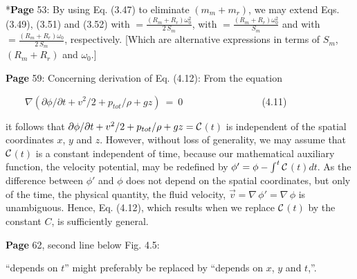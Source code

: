 \documentclass[a4paper,12pt]{article}
\begin{document}
\noindent %
*{\bf Page} 53: By using Eq. (3.47) to eliminate $(m_m + m_r)$, we may extend Eqs. (3.49), (3.51) and (3.52) with \quad  $= \frac{(R_m + R_r)\omega_0^2}{2 \, S_m}$, \quad with \quad $= \frac{(R_m + R_r)\omega_0^2}{S_m}$ \quad and with $= \frac{(R_m + R_r)\omega_0}{2 \, S_m}$, respectively. [Which are alternative expressions in terms of $S_m$, $(R_m + R_r)$ and $\omega_0$.] 
\newline {$\diamondsuit$}  \vspace{0.15cm} %


\noindent %
{\bf Page} 59: Concerning derivation of Eq. (4.12): From the equation
 
\indent 
\,\,\,\,\,\,\,\,\,\, $\nabla\!\left(\partial\phi / \partial t + v^{2} / 2 + p_{tot} / \rho + gz\right) \ = \ 0$  \,\,\,\,\,\,\,\,\,\,\,\,\,\,\,\,\,\,\,\,\,\,\,\,\,\,\,\,\,\,\,\,\,\,\,\,\,\,\,\,\,\,\,\,\, (4.11) 

\noindent
it follows that %
 $\partial\phi / \partial t + v^{2} / 2 + p_{tot} / \rho + gz = \cal{C}$$(t)$ is independent of the spatial coordinates $x$, $y$ and $z$.  However, without loss of generality, we may assume that $\cal{C}$$(t)$ is a constant independent of time, because  our mathematical auxiliary function, the velocity potential,  may be redefined by $\phi' = \phi - \int^t \cal{C}$$(t) dt$. As the difference between  $\phi'$ and $\phi$ does not depend on the spatial coordinates, but only of the time, the physical quantity, the fluid velocity, ${\vec{v}} = \nabla\!\,\phi' =  \nabla\!\,\phi$ is unambiguous. Hence, Eq. (4.12), which results when we replace $\cal{C}$$(t)$ by the constant $C$, is sufficiently general. %
\vspace{0.2cm}

\noindent %
{\bf Page} 62, second line below Fig. 4.5: \,\,  

\noindent
``depends on $t$'' might preferably be replaced by  ``depends on $x$, $y$ and $t$,''. %
\vspace{0.4cm}
\end{document}
